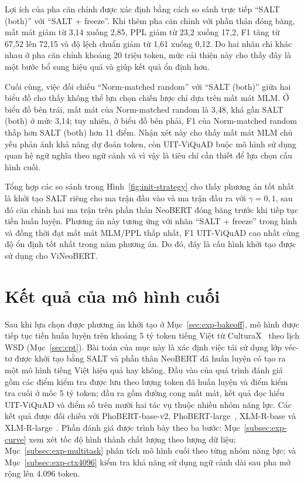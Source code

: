 Lợi ích của pha căn chỉnh được xác định bằng cách so sánh trực tiếp ``SALT (both)'' với
``SALT + freeze''. Khi thêm pha căn chỉnh với phần thân đóng băng, mất mát giảm từ 3,14
xuống 2,85, PPL giảm từ 23,2 xuống 17,2, F1 tăng từ 67,52 lên 72,15 và độ lệch chuẩn
giảm từ 1,61 xuống 0,12. Do hai nhãn chỉ khác nhau ở pha căn chỉnh khoảng 20 triệu token,
mức cải thiện này cho thấy đây là một bước bổ sung hiệu quả và giúp kết quả ổn định hơn.

Cuối cùng, việc đối chiếu ``Norm-matched random'' với ``SALT (both)'' giữa hai biểu đồ
cho thấy không thể lựa chọn chiến lược chỉ dựa trên mất mát MLM. Ở biểu đồ bên trái, mất
mát của Norm-matched random là 3,48, khá gần SALT (both) ở mức 3,14; tuy nhiên, ở biểu
đồ bên phải, F1 của Norm-matched random thấp hơn SALT (both) hơn 11 điểm. Nhận xét này
cho thấy mất mát MLM chủ yếu phản ánh khả năng dự đoán token, còn UIT-ViQuAD buộc mô
hình sử dụng quan hệ ngữ nghĩa theo ngữ cảnh và vì vậy là tiêu chí cần thiết để lựa chọn
cấu hình cuối.

Tổng hợp các so sánh trong Hình~\ref{fig:init-strategy} cho thấy phương án tốt nhất là
khởi tạo SALT riêng cho ma trận đầu vào và ma trận đầu ra với $\gamma = 0{,}1$, sau đó
căn chỉnh hai ma trận trên phần thân NeoBERT đóng băng trước khi tiếp tục tiền huấn
luyện. Phương án này tương ứng với nhãn ``SALT + freeze'' trong hình và đồng thời đạt
mất mát MLM/PPL thấp nhất, F1 UIT-ViQuAD cao nhất cùng độ ổn định tốt nhất trong năm
phương án. Do đó, đây là cấu hình khởi tạo được sử dụng cho ViNeoBERT.

\section{Kết quả của mô hình cuối}
\label{sec:exp-mrc}

Sau khi lựa chọn được phương án khởi tạo ở Mục~\ref{sec:exp-bakeoff}, mô hình được tiếp
tục tiền huấn luyện trên khoảng 5 tỷ token tiếng Việt từ
CulturaX~\cite{nguyen2023culturax} theo lịch WSD (Mục~\ref{sec:cpt}). Bài toán của mục
này là xác định việc tái sử dụng lớp véc-tơ được khởi tạo bằng SALT và phần thân NeoBERT
đã huấn luyện có tạo ra một mô hình tiếng Việt hiệu quả hay không. Đầu vào của quá trình
đánh giá gồm các điểm kiểm tra được lưu theo lượng token đã huấn luyện và điểm kiểm tra
cuối ở mốc 5 tỷ token; đầu ra gồm đường cong mất mát, kết quả đọc hiểu UIT-ViQuAD và điểm
số trên mười hai tác vụ thuộc nhiều nhóm năng lực. Các kết quả được đối chiếu với
PhoBERT-base-v2, PhoBERT-large~\cite{nguyen2020phobert}, XLM-R-base và
XLM-R-large~\cite{conneau2020xlmr}. Phần đánh giá được trình bày theo ba bước:
Mục~\ref{subsec:exp-curve} xem xét tốc độ hình thành chất lượng theo lượng dữ liệu;
Mục~\ref{subsec:exp-multitask} phân tích mô hình cuối theo từng nhóm năng lực; và
Mục~\ref{subsec:exp-ctx4096} kiểm tra khả năng sử dụng ngữ cảnh dài sau pha mở rộng lên
4.096 token.

